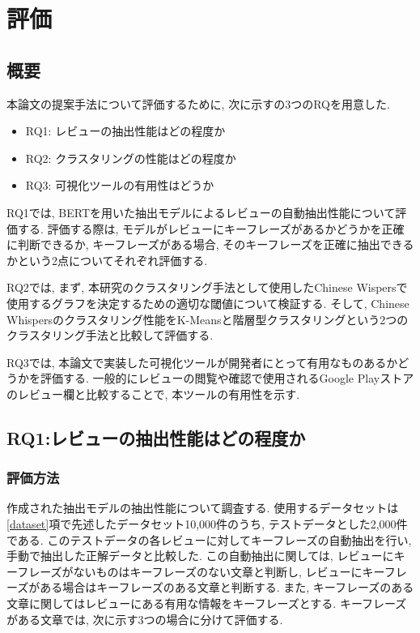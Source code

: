 \chapter{評価}
\label{chap:kekkahyouka}

\section{概要}
本論文の提案手法について評価するために, 次に示すの3つのRQを用意した. 

\begin{itemize}
  \item RQ1: レビューの抽出性能はどの程度か
  \item RQ2: クラスタリングの性能はどの程度か
  \item RQ3: 可視化ツールの有用性はどうか
\end{itemize}

RQ1では, BERTを用いた抽出モデルによるレビューの自動抽出性能について評価する. 評価する際は, モデルがレビューにキーフレーズがあるかどうかを正確に判断できるか, キーフレーズがある場合, そのキーフレーズを正確に抽出できるかという2点についてそれぞれ評価する. 

RQ2では, まず, 本研究のクラスタリング手法として使用したChinese Wispersで使用するグラフを決定するための適切な閾値について検証する. そして, Chinese Whispersのクラスタリング性能をK-Meansと階層型クラスタリングという2つのクラスタリング手法と比較して評価する. 

RQ3では, 本論文で実装した可視化ツールが開発者にとって有用なものあるかどうかを評価する. 一般的にレビューの閲覧や確認で使用されるGoogle Playストアのレビュー欄と比較することで, 本ツールの有用性を示す. 

\section{RQ1:レビューの抽出性能はどの程度か}
\subsection{評価方法}\label{method}
作成された抽出モデルの抽出性能について調査する. 使用するデータセットは\ref{dataset}項で先述したデータセット10,000件のうち, テストデータとした2,000件である. このテストデータの各レビューに対してキーフレーズの自動抽出を行い, 手動で抽出した正解データと比較した. 
この自動抽出に関しては, レビューにキーフレーズがないものはキーフレーズのない文章と判断し, レビューにキーフレーズがある場合はキーフレーズのある文章と判断する. また, キーフレーズのある文章に関してはレビューにある有用な情報をキーフレーズとする. 
キーフレーズがある文章では, 次に示す3つの場合に分けて評価する. 


